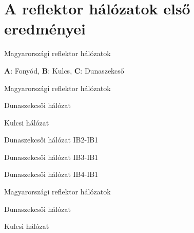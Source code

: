 \documentclass[aspectratio=169]{beamer}
\begin{document}
\section{A reflektor hálózatok első eredményei}


\begin{frame}{Magyarországi reflektor hálózatok}
    \centering
    \begin{minipage}[c]{0.7\textwidth}
        \hun
        \begin{center}
            \textbf{A}: Fonyód,
            \textbf{B}: Kulcs,
            \textbf{C}: Dunaszekcső
        \end{center}
    \end{minipage}
\end{frame}


\begin{frame}{Magyarországi reflektor hálózatok}
    \begin{minipage}[c]{0.365\textwidth}
        \centering
        \dszekcso

        Dunaszekcsői hálózat
    \end{minipage}
    \hspace{10pt}
    \begin{minipage}[c]{0.58\textwidth}
        \centering
        \kulcs

        Kulcsi hálózat
    \end{minipage}
\end{frame}




\begin{frame}{Dunaszekcsői hálózat IB2-IB1}
\end{frame}

\begin{frame}{Dunaszekcsői hálózat IB3-IB1}
\end{frame}

\begin{frame}{Dunaszekcsői hálózat IB4-IB1}
\end{frame}


\begin{frame}{Magyarországi reflektor hálózatok}
    \begin{minipage}[c]{0.365\textwidth}
        \centering
        \dszekcso

        Dunaszekcsői hálózat
    \end{minipage}
    \hspace{10pt}
    \begin{minipage}[c]{0.58\textwidth}
        \centering
        \kulcs

        Kulcsi hálózat
    \end{minipage}
\end{frame}
\end{document}
